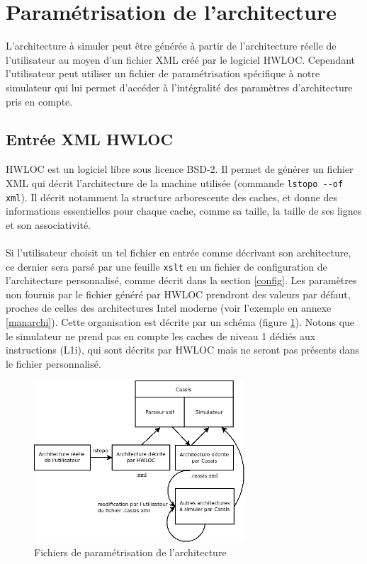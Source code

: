 \section{Paramétrisation de l'architecture}

\label{param_xml}
L'architecture à simuler peut être générée à partir de l'architecture réelle de l'utilisateur au moyen d'un fichier XML créé par le logiciel \textsf{HWLOC}. Cependant l'utilisateur peut utiliser un fichier de paramétrisation spécifique à notre simulateur qui lui permet d'accéder à l'intégralité des paramètres d'architecture pris en compte.

\subsection{Entrée XML HWLOC}

\textsf{HWLOC} est un logiciel libre sous licence BSD-2. Il permet de générer un fichier XML qui décrit l'architecture de la machine utilisée (commande \verb?lstopo --of xml?). Il décrit notamment la structure arborescente des caches, et donne des informations essentielles pour chaque cache, comme sa taille, la taille de ses lignes et son associativité. 

\paragraph{}
Si l'utilisateur choisit un tel fichier en entrée comme décrivant son architecture, ce dernier sera parsé par une feuille \texttt{xslt} en un fichier de configuration de l'architecture personnalisé, comme décrit dans la section \ref{config}. Les paramètres non fournis par le fichier généré par \textsf{HWLOC} prendront des valeurs par défaut, proches de celles des architectures \textsf{Intel} moderne (voir l'exemple en annexe \ref{manarchi}). Cette organisation est décrite par un schéma (figure \ref{img:archi}). Notons que le simulateur ne prend pas en compte les caches de niveau 1 dédiés aux instructions (L1i), qui sont décrits par \textsf{HWLOC} mais ne seront pas présents dans le fichier personnalisé.

\begin{figure}[!h]
\begin{center}
   \includegraphics[width=0.7\textwidth]{images/schema_archi.png}
   \caption{\label{img:archi} Fichiers de paramétrisation de l'architecture}
\end{center}
\end{figure}

